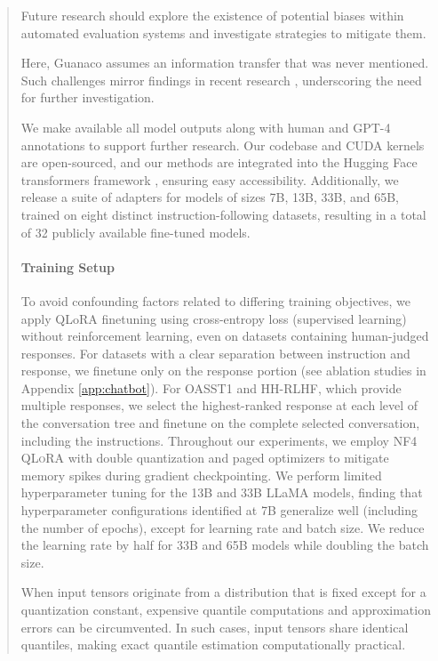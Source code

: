 \begin{quote}
Future research should explore the existence of potential biases within automated evaluation systems and investigate strategies to mitigate them.

Here, {Guanaco} assumes an information transfer that was never mentioned. Such challenges mirror findings in recent research \cite{sap2022neural}, underscoring the need for further investigation.

We make available all model outputs along with human and GPT-4 annotations to support further research. Our codebase and CUDA kernels are open-sourced, and our methods are integrated into the Hugging Face transformers framework \citep{wolf2019huggingface}, ensuring easy accessibility. Additionally, we release a suite of adapters for models of sizes 7B, 13B, 33B, and 65B, trained on eight distinct instruction-following datasets, resulting in a total of 32 publicly available fine-tuned models.

\paragraph{Training Setup} To avoid confounding factors related to differing training objectives, we apply QLoRA finetuning using cross-entropy loss (supervised learning) without reinforcement learning, even on datasets containing human-judged responses. For datasets with a clear separation between instruction and response, we finetune only on the response portion (see ablation studies in Appendix \ref{app:chatbot}). For OASST1 and HH-RLHF, which provide multiple responses, we select the highest-ranked response at each level of the conversation tree and finetune on the complete selected conversation, including the instructions. Throughout our experiments, we employ NF4 \textsc{QLoRA} with double quantization and paged optimizers to mitigate memory spikes during gradient checkpointing. We perform limited hyperparameter tuning for the 13B and 33B LLaMA models, finding that hyperparameter configurations identified at 7B generalize well (including the number of epochs), except for learning rate and batch size. We reduce the learning rate by half for 33B and 65B models while doubling the batch size.

When input tensors originate from a distribution that is fixed except for a quantization constant, expensive quantile computations and approximation errors can be circumvented. In such cases, input tensors share identical quantiles, making exact quantile estimation computationally practical.




\end{quote}
